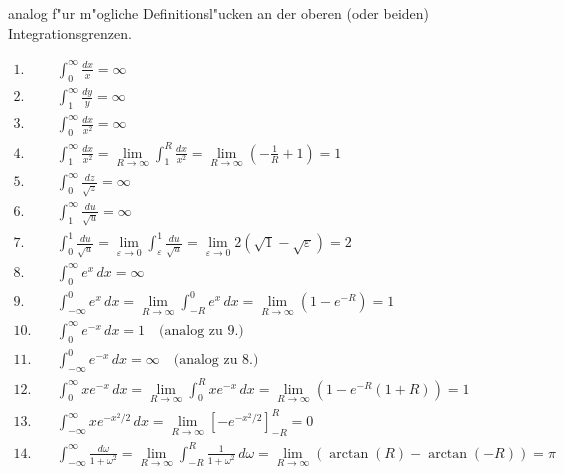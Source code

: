 \documentclass[11pt,answers]{exam}
\begin{document}
\begin{questions}
\begin{solution}
\begin{enumerate}
analog f"ur m"ogliche Definitionsl"ucken an der oberen (oder beiden) Integrationsgrenzen.
\end{enumerate}
\begin{align*}
1.&\quad\int_0^\infty\frac{dx}{x}
=\infty
\\
2.&\quad\int_1^\infty\frac{dy}{y}
=\infty
\\
3.&\quad\int_0^\infty\frac{dx}{x^2}=\infty
\\
4.&\quad\int_1^\infty\frac{dx}{x^2}
=\lim_{R\to\infty}\int_1^R\frac{dx}{x^2}
=\lim_{R\to\infty}\left(-\frac{1}{R}+1\right)=1
\\
5.&\quad\int_0^\infty\frac{dz}{\sqrt{z}}=\infty
\\
6.&\quad\int_1^\infty\frac{du}{\sqrt{u}}=\infty
\\
7.&\quad\int_0^1\frac{du}{\sqrt{u}}
=\lim_{\varepsilon\to 0}\int_\varepsilon^1\frac{du}{\sqrt{u}}
=\lim_{\varepsilon\to 0}2\left(\sqrt{1}-\sqrt{\varepsilon}\right)=2
\\
8.&\quad\int_0^\infty e^x\,dx=\infty
\\
9.&\quad\int_{-\infty}^0e^x\,dx
=\lim_{R\to\infty}\int_{-R}^0e^x\,dx
=\lim_{R\to\infty}\left(1-e^{-R}\right)=1
\\
10.&\quad\int_0^\infty e^{-x}\,dx=1\quad \text{(analog zu 9.)}
\\
11.&\quad\int_{-\infty}^0e^{-x}\,dx=\infty\quad \text{(analog zu 8.)}
\\
12.&\quad\int_0^\infty xe^{-x}\,dx
=\lim_{R\to\infty}\int_0^R xe^{-x}\,dx
=\lim_{R\to\infty}\left(1-e^{-R}(1+R)\right)=1
\\
13.&\quad\int_{-\infty}^\infty xe^{-x^2/2}\,dx
=\lim_{R\to\infty}\left[-e^{-x^2/2}\right]^R_{-R}
=0
\\
14.&\quad\int_{-\infty}^{\infty}\frac{d\omega}{1+\omega^2}
=\lim_{R\to\infty}\int_{-R}^R\frac{1}{1+\omega^2}\,d\omega
=\lim_{R\to\infty}\left(\arctan(R)-\arctan(-R)\right)=\pi
\end{align*}
\end{solution}



\end{questions}
\end{document}
